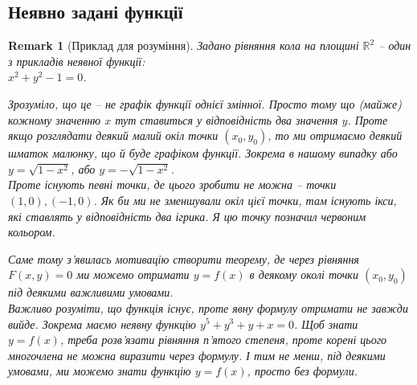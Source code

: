 \documentclass[a4paper, 10pt]{article}
\theoremstyle{theoremdd}
\theoremstyle{theoremdd}
\theoremstyle{theoremdd}
\theoremstyle{theoremdd}
\theoremstyle{theoremdd}
\theoremstyle{theoremdd}
\theoremstyle{theoremdd}
\newtheorem{remark}[theorem]{Remark}
\theoremstyle{theoremdd}
\theoremstyle{theoremdd}
\begin{document}
\subsection{Неявно задані функції}
\begin{remark}[Приклад для розуміння]
Задано рівняння кола на площині $\mathbb{R}^2$ -- один з прикладів неявної функції:\\ $x^2+y^2-1=0$.
\begin{figure}[H]
\centering
{}
\end{figure}
Зрозуміло, що це -- не графік функції однієї змінної. Просто тому що (майже) кожному значенню $x$ тут ставиться у відповідність два значення $y$. Проте якщо розглядати деякий малий окіл точки $(x_0,y_0)$, то ми отримаємо деякий шматок малюнку, що й буде графіком функції. Зокрема в нашому випадку або $y = \sqrt{1-x^2}$, або $y = -\sqrt{1-x^2}$.\\
Проте існують певні точки, де цього зробити не можна -- точки $(1,0),(-1,0)$. Як би ми не зменшували окіл цієї точки, там існують ікси, які ставлять у відповідність два ігрика. Я цю точку позначил червоним кольором.
\begin{figure}[H]
\centering
{}
\end{figure}
Саме тому з'явилась мотивацію створити теорему, де через рівняння $F(x,y) = 0$ ми можемо отримати $y = f(x)$ в деякому околі точки $(x_0,y_0)$ під деякими важливими умовами.
\bigskip \\
Важливо розуміти, що функція існує, проте явну формулу отримати не завжди вийде. Зокрема маємо неявну функцію $y^5+y^3+y+x=0$. Щоб знати $y=f(x)$, треба розв'язати рівняння п'ятого степеня, проте корені цього многочлена не можна виразити через формулу. І тим не менш, під деякими умовами, ми можемо знати функцію $y=f(x)$, просто без формули.
\end{remark}
\end{document}
